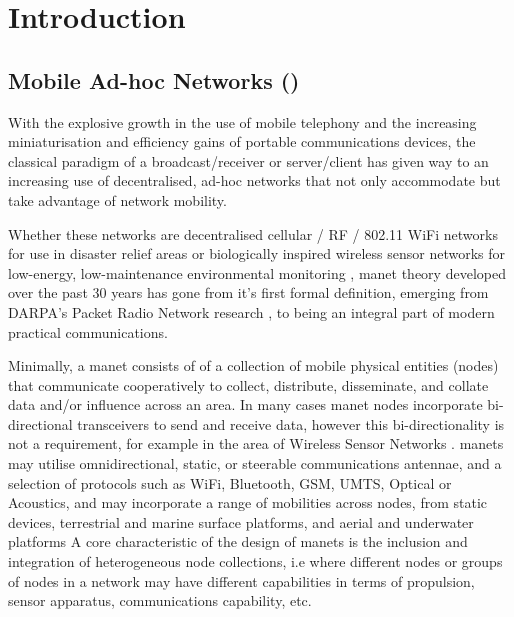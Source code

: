 \def\ChapterTitle{Introduction} %

\ifx\ifthesis\undefined

\else
\chapter{\ChapterTitle}
\label{Chapter\thechapter}
\fi

\section{Mobile Ad-hoc Networks ()}

With the explosive growth in the use of mobile telephony and the increasing miniaturisation and efficiency gains of portable communications devices, the classical paradigm of a broadcast/receiver or server/client has given way to an increasing use of decentralised, ad-hoc networks that not only accommodate but take advantage of network mobility.

Whether these networks are decentralised cellular / RF / 802.11 WiFi networks for use in disaster relief areas \cite{Milliken2015} or biologically inspired wireless sensor networks for low-energy, low-maintenance environmental monitoring \cite{Nicholson2008}\cite{Selvakennedy2007}, \gls{manet} theory developed over the past 30 years has gone from it's first formal definition, emerging from DARPA's Packet Radio Network research \cite{Jubin1987}, to being an integral part of modern practical communications.

Minimally, a \gls{manet} consists of of a collection of mobile physical entities (nodes) that communicate cooperatively to collect, distribute, disseminate, and collate data and/or influence across an area.
In many cases \gls{manet} nodes incorporate bi-directional transceivers to send and receive data, however this bi-directionality is not a requirement, for example in the area of Wireless Sensor Networks \cite{Akyildiz2002}.
\glspl{manet} may utilise omnidirectional, static, or steerable communications antennae, and a selection of protocols such as WiFi, Bluetooth, GSM, UMTS, Optical or Acoustics, and may incorporate a range of mobilities across nodes, from static devices, terrestrial and marine surface platforms, and aerial and underwater platforms
A core characteristic of the design of \glspl{manet} is the inclusion and integration of heterogeneous node collections, i.e where different nodes or groups of nodes in a network may have different capabilities in terms of propulsion, sensor apparatus, communications capability, etc.

